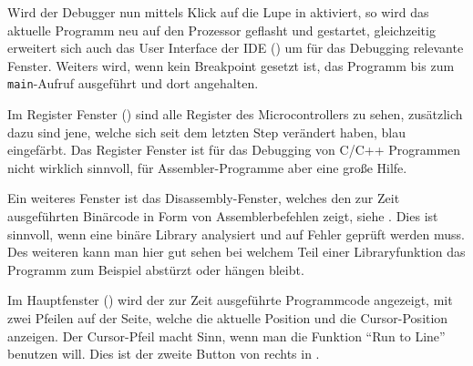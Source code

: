 
Wird der Debugger nun mittels Klick auf die Lupe in  aktiviert, so wird das aktuelle Programm neu auf den Prozessor geflasht und gestartet, gleichzeitig erweitert sich auch das User Interface der \gls{IDE} () um für das \gls{Debugging} relevante Fenster. Weiters wird, wenn kein Breakpoint gesetzt ist, das Programm bis zum \texttt{main}-Aufruf ausgeführt und dort angehalten.


Im Register Fenster () sind alle Register des Microcontrollers zu sehen, zusätzlich dazu sind jene, welche sich seit dem letzten Step verändert haben, blau eingefärbt. Das Register Fenster ist für das \gls{Debugging} von \gls{C}/\gls{C++} Programmen nicht wirklich sinnvoll, für Assembler-Programme aber eine große Hilfe.


Ein weiteres Fenster ist das Disassembly-Fenster, welches den zur Zeit ausgeführten Binärcode in Form von Assemblerbefehlen zeigt, siehe . Dies ist sinnvoll, wenn eine binäre Library analysiert und auf Fehler geprüft werden muss. Des weiteren kann man hier gut sehen bei welchem Teil einer Libraryfunktion das Programm zum Beispiel abstürzt oder hängen bleibt.


Im Hauptfenster () wird der zur Zeit ausgeführte Programmcode angezeigt, mit zwei Pfeilen auf der Seite, welche die aktuelle Position und die Cursor-Position anzeigen. Der Cursor-Pfeil macht Sinn, wenn man die Funktion \enquote{Run to Line} benutzen will. Dies ist der zweite Button von rechts in .



